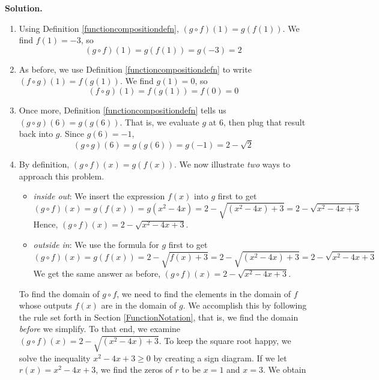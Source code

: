 \begin{ex}
\begin{multicols}{4}
\begin{enumerate}
\end{enumerate}
\end{multicols}

{\bf Solution.}  
\begin{enumerate}

\item  Using Definition \ref{functioncompositiondefn}, $(g \circ f)(1) = g(f(1))$.  We find $f(1) = -3$, so \[(g \circ f)(1) = g(f(1)) = g(-3) = 2 \]

\item As before, we use Definition \ref{functioncompositiondefn} to write $(f \circ g)(1) = f(g(1))$.  We find $g(1) = 0$, so \[(f \circ g)(1) = f(g(1)) = f(0) = 0 \] 

\item  Once more, Definition \ref{functioncompositiondefn} tells us $(g \circ g)(6) = g(g(6))$.  That is, we evaluate $g$ at $6$, then plug that result back into $g$. Since $g(6) = -1$,  \[(g \circ g)(6) = g(g(6)) = g(-1) = 2-\sqrt{2} \]


\item  By definition, $(g \circ f)(x) = g(f(x))$. We now illustrate \textit{two} ways to approach this problem.

\begin{itemize}

\item  \textit{inside out}:  We insert the expression $f(x)$ into $g$ first to get  \[(g \circ f)(x) = g(f(x)) = g\left(x^2-4x\right) = 2 - \sqrt{\left(x^2-4x\right)+3} = 2 - \sqrt{x^2-4x+3}\] Hence, $(g \circ f)(x) = 2 - \sqrt{x^2-4x+3}$.

\item  \textit{outside in}:  We use the formula for $g$ first to get  \[(g \circ f)(x) = g(f(x)) = 2 - \sqrt{f(x)+3}  = 2 - \sqrt{\left(x^2-4x\right)+3} = 2 - \sqrt{x^2-4x+3}\] We get the same answer as before,  $(g \circ f)(x) = 2 - \sqrt{x^2-4x+3}$.

\end{itemize} 

To find the domain of $g \circ f$, we need to find the elements in the domain of $f$ whose outputs $f(x)$ are in the domain of $g$.  We accomplish this by following the rule set forth in Section \ref{FunctionNotation}, that is, we find the domain \textit{before} we simplify.  To that end, we examine $(g \circ f)(x) = 2 - \sqrt{\left(x^2-4x\right)+3}$.  To keep the square root happy, we solve the inequality $x^2-4x+3 \geq 0$ by creating a sign diagram.  If we let $r(x) = x^2-4x+3$, we find the zeros of $r$ to be $x = 1$ and $x = 3$.  We obtain


\end{enumerate}
\end{ex}
